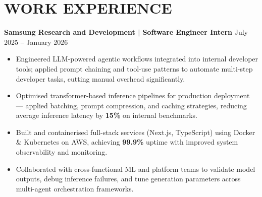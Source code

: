 \documentclass[a4paper,11pt]{article}
\begin{document}
\section*{WORK EXPERIENCE}
\textbf{Samsung Research and Development $|$ Software Engineer Intern}
\hfill July 2025 -- January 2026
\begin{itemize}
    \item Engineered LLM-powered agentic workflows integrated into internal
    developer tools; applied prompt chaining and tool-use patterns to automate
    multi-step developer tasks, cutting manual overhead significantly.
    \item Optimised transformer-based inference pipelines for production
    deployment — applied batching, prompt compression, and caching strategies,
    reducing average inference latency by \textbf{15\%} on internal benchmarks.
    \item Built and containerised full-stack services (Next.js, TypeScript)
    using Docker \& Kubernetes on AWS, achieving \textbf{99.9\%} uptime with
    improved system observability and monitoring.
    \item Collaborated with cross-functional ML and platform teams to validate
    model outputs, debug inference failures, and tune generation parameters
    across multi-agent orchestration frameworks.
\end{itemize}
\vspace{-0.1cm}
\end{document}

